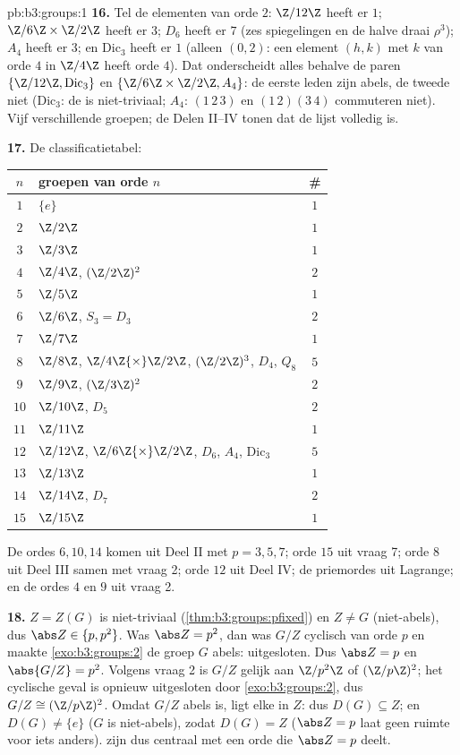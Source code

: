 \begin{solution}{pb:b3:groups:1}
\textbf{16.} Tel de elementen van orde $2$: $\Z/12\Z$ heeft er $1$;
$\Z/6\Z\times\Z/2\Z$ heeft er $3$; $D_6$ heeft er $7$ (zes
spiegelingen en de halve draai $\rho^3$); $A_4$ heeft er $3$; en
$\mathrm{Dic}_3$ heeft er $1$ (alleen $(0, 2)$: een element $(h,
k)$ met $k$ van orde $4$ in $\Z/4\Z$ heeft orde $4$). Dat
onderscheidt alles behalve de paren $\{\Z/12\Z, \mathrm{Dic}_3\}$
en $\{\Z/6\Z\times\Z/2\Z, A_4\}$: de eerste leden zijn abels, de
tweede niet ($\mathrm{Dic}_3$: de  is niet-triviaal; $A_4$:
$(1\,2\,3)$ en $(1\,2)(3\,4)$ commuteren niet). Vijf verschillende
groepen; de Delen II--IV tonen dat de lijst volledig is.

\textbf{17.} De classificatietabel:
\begin{center}
\begin{tabular}{c l c}
$n$ & groepen van orde $n$ & \#\\
\hline
$1$ & $\{e\}$ & $1$\\
$2$ & $\Z/2\Z$ & $1$\\
$3$ & $\Z/3\Z$ & $1$\\
$4$ & $\Z/4\Z$, $(\Z/2\Z)^2$ & $2$\\
$5$ & $\Z/5\Z$ & $1$\\
$6$ & $\Z/6\Z$, $S_3 = D_3$ & $2$\\
$7$ & $\Z/7\Z$ & $1$\\
$8$ & $\Z/8\Z$, $\Z/4\Z{\times}\Z/2\Z$, $(\Z/2\Z)^3$, $D_4$,
      $Q_8$ & $5$\\
$9$ & $\Z/9\Z$, $(\Z/3\Z)^2$ & $2$\\
$10$ & $\Z/10\Z$, $D_5$ & $2$\\
$11$ & $\Z/11\Z$ & $1$\\
$12$ & $\Z/12\Z$, $\Z/6\Z{\times}\Z/2\Z$, $D_6$, $A_4$,
       $\mathrm{Dic}_3$ & $5$\\
$13$ & $\Z/13\Z$ & $1$\\
$14$ & $\Z/14\Z$, $D_7$ & $2$\\
$15$ & $\Z/15\Z$ & $1$\\
\end{tabular}
\end{center}
De ordes $6, 10, 14$ komen uit Deel II met $p = 3, 5, 7$; orde $15$
uit vraag 7; orde $8$ uit Deel III samen met vraag 2; orde $12$ uit
Deel IV; de priemordes uit Lagrange; en de ordes $4$ en $9$ uit
vraag 2.

\textbf{18.} $Z = Z(G)$ is niet-triviaal
(\cref{thm:b3:groups:pfixed}) en $Z \neq G$ (niet-abels), dus $\abs
Z \in \{p, p^2\}$. Was $\abs Z = p^2$, dan was $G/Z$ cyclisch van
orde $p$ en maakte \cref{exo:b3:groups:2} de groep $G$ abels:
uitgesloten. Dus $\abs Z = p$ en $\abs{G/Z} = p^2$. Volgens vraag 2
is $G/Z$ gelijk aan $\Z/p^2\Z$ of $(\Z/p\Z)^2$; het cyclische geval
is opnieuw uitgesloten door \cref{exo:b3:groups:2}, dus $G/Z \cong
(\Z/p\Z)^2$. Omdat $G/Z$ abels is, ligt elke  in $Z$: dus
$D(G) \subseteq Z$; en $D(G) \neq \{e\}$ ($G$ is niet-abels), zodat
$D(G) = Z$ ($\abs Z = p$ laat geen ruimte voor iets anders).
 zijn dus centraal met een orde die $\abs Z = p$ deelt.


\end{solution}
